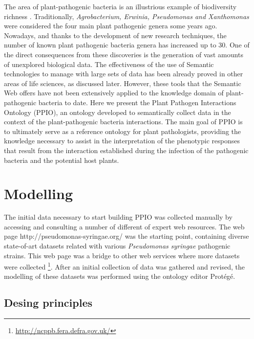\documentclass[sw]{iosart2c}
\newcommand{\myurl}[1]{\footnote{\url{#1}}}
\begin{document}
The area of plant-pathogenic bacteria is an illustrious example of biodiversity richness \cite{Bull2010}. Traditionally, {\itshape Agrobacterium, Erwinia, Pseudomonas and Xanthomonas} were considered the four main plant pathogenic genera some years ago. Nowadays, and thanks to the development of new research techniques, the number of known plant pathogenic bacteria genera has increased up to 30. One of the direct consequences from these discoveries is the generation of vast amounts of unexplored biological data. The effectiveness of the use of Semantic technologies to manage with large sets of data has been already proved in other areas of life sciences, as discussed later. However, these tools that the Semantic Web offers have not been extensively applied to the knowledge domain of plant-pathogenic bacteria to date. Here we present the Plant Pathogen Interactions Ontology (PPIO), an ontology developed to semantically collect data in the context of the plant-pathogenic bacteria interactions. The main goal of PPIO is to ultimately serve as a reference ontology for plant pathologists, providing the knowledge necessary to assist in the interpretation of the phenotypic responses that result from the interaction established during the infection of the pathogenic bacteria and the potential host plants.




\section{Modelling}

The initial data necessary to start building PPIO was collected manually by accessing and consulting a number of different of expert web resources. The web page http://pseudomonas-syringae.org/ was the starting point, containing diverse state-of-art datasets related with various {\itshape Pseudomonas syringae} pathogenic strains. This web page was a bridge to other web services where more datasets were collected \myurl{http://ncppb.fera.defra.gov.uk/}. After an initial collection of data was gathered and revised, the modelling of these datasets was performed using the ontology editor Prot\'eg\'e.

\subsection{Desing principles}
\end{document}
